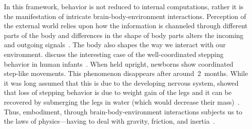 In this framework, behavior is not reduced to internal computations, rather it is the manifestation of intricate brain-body-environment interactions.
Perception of the external world relies upon how the information is channeled through different parts of the body and differences in the shape of body parts alters the incoming and outgoing signals~\cite{Gomez2019Neuron}.
The body also shapes the way we interact with our environment.
 discuss the interesting case of the well-coordinated stepping behavior in human infants~\cite{Gomez2019Neuron}.
When held upright, newborns show coordinated step-like movements.
This phenomenon disappears after around~2~months.
While it was long assumed that this is due to the developing nervous system, \citeauthor{Thelen1984InfBeh} showed that loss of stepping behavior is due to weight gain of the legs and it can be recovered by submerging the legs in water (which would decrease their mass)~\cite{Thelen1984InfBeh}.
Thus, embodiment, through brain-body-environment interactions subjects us to the laws of physics---having to deal with gravity, friction, and inertia~\cite{Pfeifer2006Book}.



